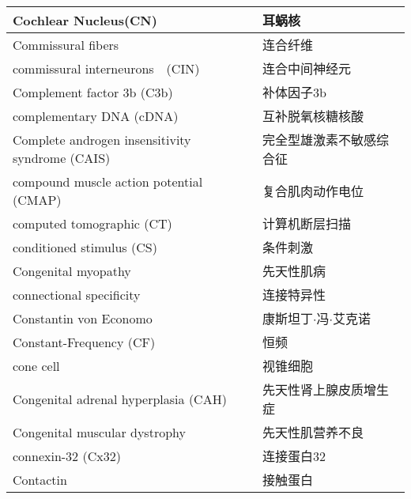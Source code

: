 \begin{longtable}{lll}
	\midrule
	Cochlear Nucleus(CN)   && 耳蜗核  \\
	
	\midrule
	Commissural fibers   && 连合纤维  \\
	
	\midrule
	commissural interneurons　(CIN)   && 连合中间神经元  \\
	
	\midrule
	Complement factor 3b (C3b)  && 补体因子3b  \\
	
	\midrule
	complementary DNA (cDNA)   && 互补脱氧核糖核酸  \\
	
	\midrule
	\makecell[l]{Complete androgen insensitivity\\ syndrome (CAIS)}  && 完全型雄激素不敏感综合征  \\
	
	\midrule
	compound muscle action potential (CMAP) && 复合肌肉动作电位  \\
	
	\midrule
	computed tomographic (CT)   && 计算机断层扫描  \\
	
	\midrule
	conditioned stimulus (CS)     &&  条件刺激  \\
	
	\midrule
	Congenital myopathy     &&  先天性肌病  \\
	
	\midrule
	connectional specificity     &&  连接特异性  \\
	
	\midrule
	Constantin von Economo    &&  康斯坦丁$\cdot$冯$\cdot$艾克诺  \\
	
	\midrule
	Constant-Frequency (CF)     &&  恒频  \\
	
	\midrule
	cone cell      && 视锥细胞  \\
	
	\midrule
	Congenital adrenal hyperplasia (CAH)  && 先天性肾上腺皮质增生症  \\
	
	\midrule
	Congenital muscular dystrophy  && 先天性肌营养不良  \\
	
	\midrule
	connexin-32 (Cx32) && 连接蛋白32  \\
	
	\midrule
	Contactin && 接触蛋白  \\
	

\end{longtable}
